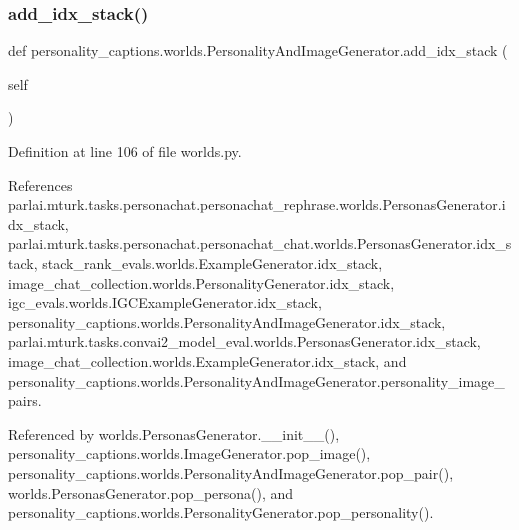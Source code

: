 \subsubsection{\texorpdfstring{add\+\_\+idx\+\_\+stack()}{add\_idx\_stack()}}
{\footnotesize\ttfamily def personality\+\_\+captions.\+worlds.\+Personality\+And\+Image\+Generator.\+add\+\_\+idx\+\_\+stack (\begin{DoxyParamCaption}\item[{}]{self }\end{DoxyParamCaption})}



Definition at line 106 of file worlds.\+py.



References parlai.\+mturk.\+tasks.\+personachat.\+personachat\+\_\+rephrase.\+worlds.\+Personas\+Generator.\+idx\+\_\+stack, parlai.\+mturk.\+tasks.\+personachat.\+personachat\+\_\+chat.\+worlds.\+Personas\+Generator.\+idx\+\_\+stack, stack\+\_\+rank\+\_\+evals.\+worlds.\+Example\+Generator.\+idx\+\_\+stack, image\+\_\+chat\+\_\+collection.\+worlds.\+Personality\+Generator.\+idx\+\_\+stack, igc\+\_\+evals.\+worlds.\+I\+G\+C\+Example\+Generator.\+idx\+\_\+stack, personality\+\_\+captions.\+worlds.\+Personality\+And\+Image\+Generator.\+idx\+\_\+stack, parlai.\+mturk.\+tasks.\+convai2\+\_\+model\+\_\+eval.\+worlds.\+Personas\+Generator.\+idx\+\_\+stack, image\+\_\+chat\+\_\+collection.\+worlds.\+Example\+Generator.\+idx\+\_\+stack, and personality\+\_\+captions.\+worlds.\+Personality\+And\+Image\+Generator.\+personality\+\_\+image\+\_\+pairs.



Referenced by worlds.\+Personas\+Generator.\+\_\+\+\_\+init\+\_\+\+\_\+(), personality\+\_\+captions.\+worlds.\+Image\+Generator.\+pop\+\_\+image(), personality\+\_\+captions.\+worlds.\+Personality\+And\+Image\+Generator.\+pop\+\_\+pair(), worlds.\+Personas\+Generator.\+pop\+\_\+persona(), and personality\+\_\+captions.\+worlds.\+Personality\+Generator.\+pop\+\_\+personality().

